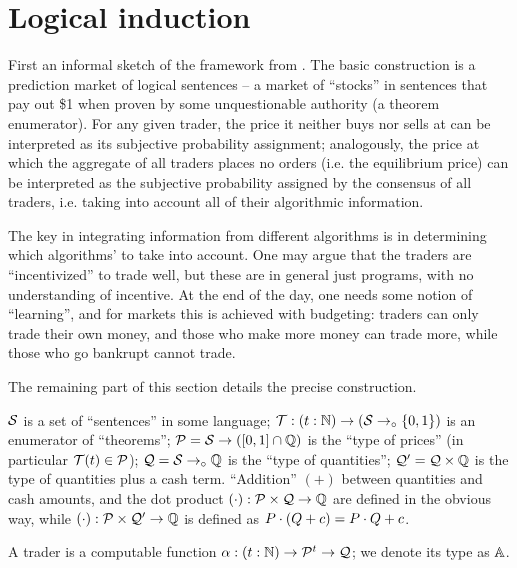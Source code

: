 \section{Logical induction}

First an informal sketch of the framework from \cite{logical_induction}. The basic construction is a prediction market of logical sentences -- a market of ``stocks'' in sentences that pay out \$1 when proven by some unquestionable authority (a theorem enumerator). For any given trader, the price it neither buys nor sells at can be interpreted as its subjective probability assignment; analogously, the price at which the aggregate of all traders places no orders (i.e. the equilibrium price) can be interpreted as the subjective probability assigned by the consensus of all traders, i.e. taking into account all of their algorithmic information.

The key in integrating information from different algorithms is in determining which algorithms' to take into account. One may argue that the traders are ``incentivized'' to trade well, but these are in general just programs, with no understanding of incentive. At the end of the day, one needs some notion of ``learning'', and for markets this is achieved with budgeting: traders can only trade their own money, and those who make more money can trade more, while those who go bankrupt cannot trade.

The remaining part of this section details the precise construction.

\begin{constants}
    $\mathcal{S}$ is a set of ``sentences'' in some language; $\mathcal{T}:(t:\mathbb{N})\to(\mathcal{S}\to_\circ\{0,1\})$ is an enumerator of ``theorems''; $\mathcal{P} = \mathcal{S}\to([0,1]\cap\mathbb{Q})$ is the ``type of prices'' (in particular $\mathcal{T}(t)\in\mathcal{P}$); $\mathcal{Q} = \mathcal{S}\to_\circ \mathbb{Q}$ is the ``type of quantities''; $\mathcal{Q}'=\mathcal{Q}\times\mathbb{Q}$ is the type of quantities plus a cash term. ``Addition'' $(+)$ between quantities and cash amounts, and the dot product $(\cdot):\mathcal{P}\times\mathcal{Q}\to\mathbb{Q}$ are defined in the obvious way, while $(\cdot):\mathcal{P}\times\mathcal{Q}'\to\mathbb{Q}$ is defined as $P\cdot(Q+c)=P\cdot Q+c$.
\end{constants}

\begin{definition}\label{def:trader}
    A trader is a computable function $\alpha : (t : \mathbb{N})\to \mathcal{P}^t\to\mathcal{Q}$; we denote its type as $\mathbb{A}$.
\end{definition}

